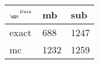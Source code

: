 \begin{tabular}{lll}
    \toprule
    $_{\text{\tiny{\ggn}}}$$^{\text{\tiny{Data}}}$ & mb & sub \\
    \midrule
    exact & 688
              & 1247 \\
    mc   & 1232
              & 1259 \\
    \bottomrule
\end{tabular}